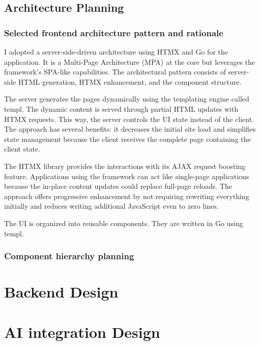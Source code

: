 \subsection{Architecture Planning}

\subsubsection{Selected frontend architecture pattern and rationale}
        
I adopted a server-side-driven architecture using HTMX and Go for the application. It is a Multi-Page Architecture (MPA) at the core but leverages the framework's SPA-like capabilities. The architectural pattern consists of server-side HTML generation, HTMX enhancement, and the component structure.

The server generates the pages dynamically using the templating engine called templ. The dynamic content is served through partial HTML updates with HTMX requests. This way, the server controls the UI state instead of the client. The approach has several benefits: it decreases the initial site load and simplifies state management because the client receives the complete page containing the client state.

The HTMX library provides the interactions with its AJAX request boosting feature. Applications using the framework can act like single-page applications because the in-place content updates could replace full-page reloads. The approach offers progressive enhancement by not requiring rewriting everything initially and reduces writing additional JavaScript even to zero lines.

The UI is organized into reusable components. They are written in Go using templ.

\subsubsection{Component hierarchy planning}

\subsubsection{}

\section{Backend Design}

\section{AI integration Design}